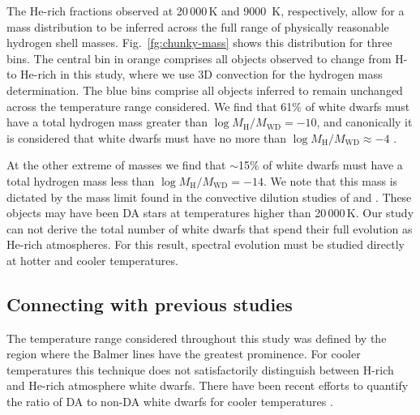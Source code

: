 \documentclass[a4paper,fleqn,usenatbib]{mnras}
\begin{document}
The He-rich fractions observed at 20\,000\,K and 9000~K, respectively, allow for a mass distribution to be inferred across the full range of physically reasonable hydrogen shell masses. Fig.~\ref{fg:chunky-mass} shows this distribution for three bins. The central bin in orange comprises all objects observed to change from H- to He-rich in this study, where we use 3D convection for the hydrogen mass determination. The blue bins comprise all objects inferred to remain unchanged across the temperature range considered. We find that 61\% of white dwarfs must have a total hydrogen mass greater than $\log M_{\mathrm{H}}/M_{\mathrm{WD}}=-10$, and canonically it is considered that white dwarfs must have no more than $\log M_{\mathrm{H}}/M_{\mathrm{WD}} \approx -4$ \citep{romero19}. 

At the other extreme of masses we find that $\sim$15\% of white dwarfs must have a total hydrogen mass less than $\log M_{\mathrm{H}}/M_{\mathrm{WD}}=-14$. We note that this mass is dictated by the mass limit found in the convective dilution studies of \citet{rolland18} and \citet{genest-Beaulieu19}. These objects may have been DA stars at temperatures higher than 20\,000\,K. Our study can not derive the total number of white dwarfs that spend their full evolution as He-rich atmospheres. For this result, spectral evolution must be studied directly at hotter and cooler temperatures.

\subsection{Connecting with previous studies}
The temperature range considered throughout this study was defined by the region where the Balmer lines have the greatest prominence. For cooler temperatures this technique does not satisfactorily distinguish between H-rich and He-rich atmosphere white dwarfs. There have been recent efforts to quantify the ratio of DA to non-DA white dwarfs for cooler temperatures \citep{blouin19}.
\end{document}
